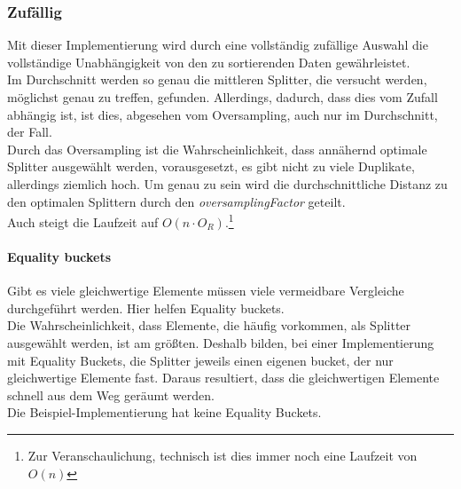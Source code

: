 		\subsubsection{Zufällig}
			\label{sec:random}
			
			Mit dieser Implementierung wird durch eine vollständig zufällige Auswahl die vollständige Unabhängigkeit von den zu sortierenden Daten gewährleistet.\\
			Im Durchschnitt werden so genau die mittleren Splitter, die versucht werden, möglichst genau zu treffen, gefunden.
			Allerdings, dadurch, dass dies vom Zufall abhängig ist, ist dies, abgesehen vom Oversampling, auch nur im Durchschnitt, der Fall.\\
			Durch das Oversampling ist die Wahrscheinlichkeit, dass annähernd optimale Splitter ausgewählt werden, vorausgesetzt, es gibt nicht zu viele Duplikate, allerdings ziemlich hoch.
			Um genau zu sein wird die durchschnittliche Distanz zu den optimalen Splittern durch den \textit{oversamplingFactor} geteilt.\\
			Auch steigt die Laufzeit auf $O(n\cdot O_R)$.\footnote{Zur Veranschaulichung, technisch ist dies immer noch eine Laufzeit von $O(n)$}

			\paragraph{Equality buckets}
				Gibt es viele gleichwertige Elemente müssen viele vermeidbare Vergleiche durchgeführt werden.
				Hier helfen Equality buckets.\\
				Die Wahrscheinlichkeit, dass Elemente, die häufig vorkommen, als Splitter ausgewählt werden, ist am größten.
				Deshalb bilden, bei einer Implementierung mit Equality Buckets, die Splitter jeweils einen eigenen bucket, der nur gleichwertige Elemente fast.
				Daraus resultiert, dass die gleichwertigen Elemente schnell aus dem Weg geräumt werden.\\
				Die Beispiel-Implementierung hat keine Equality Buckets.

